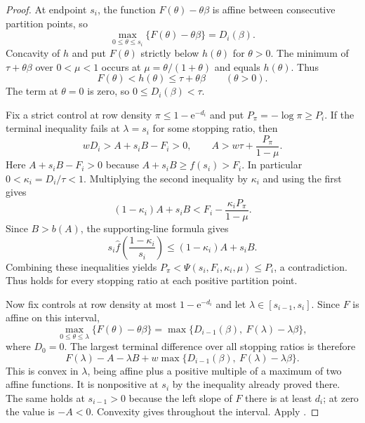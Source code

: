 \documentclass[11pt]{article}
\theoremstyle{definition}
\newcommand{\e}{\mathrm e}
\begin{document}
\begin{proof}
At endpoint $s_i$, the function $F(\theta)-\theta\beta$ is affine between consecutive partition points, so
\[
 \max_{0\le\theta\le s_i}\{F(\theta)-\theta\beta\}=D_i(\beta).
\]
Concavity of $h$ and  put $F(\theta)$ strictly below $h(\theta)$ for $\theta>0$.
The minimum of $\tau+\theta\beta$ over $0<\mu<1$ occurs at $\mu=\theta/(1+\theta)$ and equals $h(\theta)$.
Thus
\[
 F(\theta)<h(\theta)\le\tau+\theta\beta\qquad(\theta>0).
\]
The term at $\theta=0$ is zero, so $0\le D_i(\beta)<\tau$.

Fix a strict control at row density $\pi\le1-\e^{-d_i}$ and put $P_\pi=-\log\pi\ge P_i$.
If the terminal inequality fails at $\lambda=s_i$ for some stopping ratio, then
\[
 wD_i>A+s_iB-F_i>0,\qquad
 A>w\tau+\frac{P_\pi}{1-\mu}.
\]
Here $A+s_iB-F_i>0$ because $A+s_iB\ge f(s_i)>F_i$.
In particular $0<\kappa_i=D_i/\tau<1$.
Multiplying the second inequality by $\kappa_i$ and using the first gives
\[
 (1-\kappa_i)A+s_iB
 <F_i-\frac{\kappa_i P_\pi}{1-\mu}.
\]
Since $B>b(A)$, the supporting-line formula  gives
\[
 s_i\widehat f\!\left(\frac{1-\kappa_i}{s_i}\right)
 \le(1-\kappa_i)A+s_iB.
\]
Combining these inequalities yields
$P_\pi<\Psi(s_i,F_i,\kappa_i,\mu)\le P_i$, a contradiction.
Thus  holds for every stopping ratio at each positive partition point.

Now fix controls at row density at most $1-\e^{-d_i}$ and let $\lambda\in[s_{i-1},s_i]$.
Since $F$ is affine on this interval,
\[
 \max_{0\le\theta\le\lambda}\{F(\theta)-\theta\beta\}
 =\max\{D_{i-1}(\beta),\ F(\lambda)-\lambda\beta\},
\]
where $D_0=0$.
The largest terminal difference over all stopping ratios is therefore
\[
 F(\lambda)-A-\lambda B
 +w\max\{D_{i-1}(\beta),\ F(\lambda)-\lambda\beta\}.
\]
This is convex in $\lambda$, being affine plus a positive multiple of a maximum of two affine functions.
It is nonpositive at $s_i$ by the inequality already proved there.
The same holds at $s_{i-1}>0$ because the left slope of $F$ there is at least $d_i$; at zero the value is $-A<0$.
Convexity gives  throughout the interval.
Apply .
\end{proof}
\end{document}
